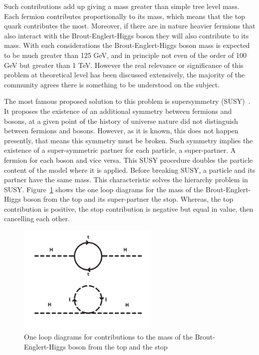 Such contributions add up giving a mass greater than simple tree level mass. Each fermion contributes proportionally to its mass, which means that the top quark contributes the most. Moreover, if there are in nature heavier fermions that also interact with the Brout-Englert-Higgs boson they will also contribute to its mass. With such considerations the Brout-Englert-Higgs boson mass is expected to be much greater than 125 GeV, and in principle not even of the order of 100 GeV but greater than 1 TeV. However the real relevance or significance of this problem at theoretical level has been discussed extensively, the majority of the community agrees there is something to be understood on the subject. 

The most famous proposed solution to this problem is supersymmetry (SUSY)~\cite{Fayet:1977yc,Martin:1997ns}. It proposes the existence of an additional symmetry between fermions and bosons, at a given point of the history of universe nature did not distinguish between fermions and bosons. However, as it is known, this does not happen presently, that means this symmetry must be broken. Such symmetry implies the existence of a super-symmetric partner for each particle, a super-partner. A fermion for each boson and vice versa. This SUSY procedure doubles the particle content of the model where it is applied. Before breaking SUSY, a particle and its partner have the same mass. This characteristic solves the hierarchy problem in SUSY. Figure~\ref{fig:susy} shows the one loop diagrams for the mass of the Brout-Englert-Higgs boson from the top and its super-partner the stop. Whereas, the top contribution is positive, the stop contribution is negative but equal in value, then cancelling each other.

\begin{figure}[!Hhtbp]
  \begin{center}
    \includegraphics[width=0.6\textwidth]{figs/SUSY.png}
    \caption{One loop diagrams for contributions to the mass of the Brout-Englert-Higgs boson from the top and the stop}
    \label{fig:susy}
  \end{center}
\end{figure}

